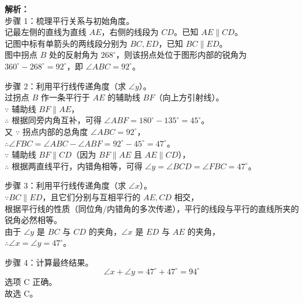 \documentclass[12pt,a4paper]{exam-zh}
\begin{document}
\begin{solution}
    \textbf{解析：} \\
    步骤 1：梳理平行关系与初始角度。\\
    记最左侧的直线为直线 $AE$，右侧的线段为 $CD$。已知 $AE \parallel CD$。\\
    记图中标有单箭头的两线段分别为 $BC, ED$，已知 $BC \parallel ED$。\\
    图中拐点 $B$ 处的反射角为 $268^\circ$，则该拐点处位于图形内部的锐角为 $360^\circ - 268^\circ = 92^\circ$，即 $\angle ABC = 92^\circ$。

    步骤 2：利用平行线传递角度（求 $\angle y$）。\\
    过拐点 $B$ 作一条平行于 $AE$ 的辅助线 $BF$（向上方引射线）。\\
    $\because$ 辅助线 $BF \parallel AE$，\\
    $\therefore$ 根据同旁内角互补，可得 $\angle ABF = 180^\circ - 135^\circ = 45^\circ$。\\
    又 $\because$ 拐点内部的总角度 $\angle ABC = 92^\circ$，\\
    $\therefore \angle FBC = \angle ABC - \angle ABF = 92^\circ - 45^\circ = 47^\circ$。\\
    $\because$ 辅助线 $BF \parallel CD$（因为 $BF \parallel AE$ 且 $AE \parallel CD$），\\
    $\therefore$ 根据两直线平行，内错角相等，可得 $\angle y = \angle BCD = \angle FBC = 47^\circ$。

    步骤 3：利用平行线传递角度（求 $\angle x$）。\\
    $\because BC \parallel ED$，且它们分别与互相平行的 $AE, CD$ 相交，\\
    根据平行线的性质（同位角/内错角的多次传递），平行的线段与平行的直线所夹的锐角必然相等。\\
    由于 $\angle y$ 是 $BC$ 与 $CD$ 的夹角，$\angle x$ 是 $ED$ 与 $AE$ 的夹角，\\
    $\therefore \angle x = \angle y = 47^\circ$。

    步骤 4：计算最终结果。
    \[ \displaystyle \angle x + \angle y = 47^\circ + 47^\circ = 94^\circ \]
    选项 C 正确。\\
    故选 C。
\end{solution}



\newpage
\end{document}
